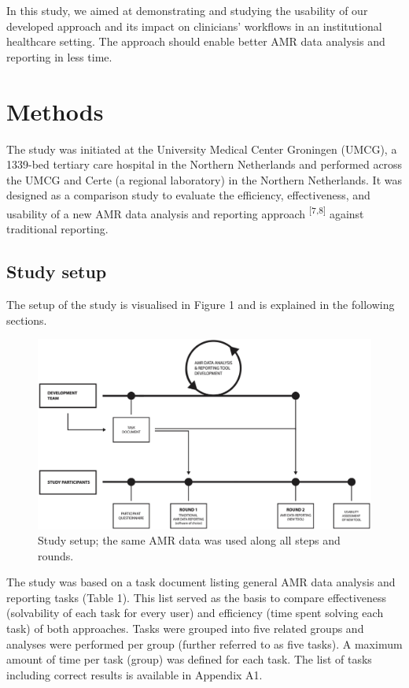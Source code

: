 \documentclass[
]{book}
\begin{document}
In this study, we aimed at demonstrating and studying the usability of our developed approach and its impact on clinicians' workflows in an institutional healthcare setting. The approach should enable better AMR data analysis and reporting in less time.

\hypertarget{methods-1}{%
\section{Methods}\label{methods-1}}

The study was initiated at the University Medical Center Groningen (UMCG), a 1339-bed tertiary care hospital in the Northern Netherlands and performed across the UMCG and Certe (a regional laboratory) in the Northern Netherlands. It was designed as a comparison study to evaluate the efficiency, effectiveness, and usability of a new AMR data analysis and reporting approach \textsuperscript{{[}7,8{]}} against traditional reporting.

\hypertarget{study-setup}{%
\subsection{Study setup}\label{study-setup}}

The setup of the study is visualised in Figure 1 and is explained in the following sections.

\begin{figure}

{\centering \includegraphics[width=1\linewidth]{images/06-01} 

}

\caption{Study setup; the same AMR data was used along all steps and rounds.}\label{fig:fig6-1}
\end{figure}

The study was based on a task document listing general AMR data analysis and reporting tasks (Table 1). This list served as the basis to compare effectiveness (solvability of each task for every user) and efficiency (time spent solving each task) of both approaches. Tasks were grouped into five related groups and analyses were performed per group (further referred to as five tasks). A maximum amount of time per task (group) was defined for each task. The list of tasks including correct results is available in Appendix A1.
\end{document}
